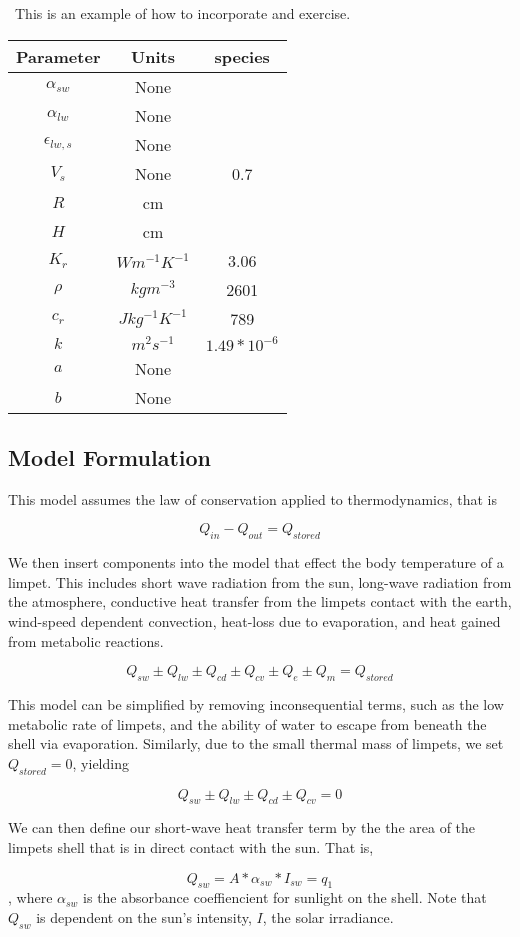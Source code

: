 \documentclass{article}
\begin{document}
\ This is an example of how to incorporate and exercise.

\begin{tabular}{| c | c | c |}\hline
Parameter & Units & species \\ \hline
$\alpha_{sw}$ & None & \\
$\alpha_{lw}$ & None & \\
$\epsilon_{lw,s}$ & None &\\
$V_s$ & None & 0.7\\
$R$ & cm &\\
$H$ & cm &\\
$K_r$ & $W m^{-1} K^{-1}$ & 3.06\\
$\rho$ & $kg m^{-3}$ & 2601\\
$c_r$ & $J kg^{-1} K^{-1}$ & 789\\
$k$ & $m^2 s^{-1}$ & $1.49*10^{-6}$\\ 
$a$ & None & \\
$b$ & None & \\ \hline
\end{tabular}

\subsection{Model Formulation}
This model assumes the law of conservation applied to thermodynamics, that is

$$Q_{in}-Q_{out}=Q_{stored}$$

We then insert components into the model that effect the body temperature of a limpet. This includes short wave radiation from the sun, long-wave radiation from the atmosphere, conductive heat transfer from the limpets contact with the earth, wind-speed dependent convection, heat-loss due to evaporation, and heat gained from metabolic reactions.

$$Q_{sw} \pm Q_{lw} \pm Q_{cd} \pm Q_{cv} \pm  Q_e \pm Q_m= Q_{stored}$$

This model can be simplified by removing inconsequential terms, such as the low metabolic rate of limpets, and the ability of water to escape from beneath the shell via evaporation. Similarly, due to the small thermal mass of limpets, we set $Q_{stored} = 0$, yielding 

$$Q_{sw} \pm Q_{lw} \pm Q_{cd} \pm Q_{cv} = 0$$

We can then define our short-wave heat transfer term by the the area of the limpets shell that is in direct contact with the sun. That is,

$$Q_{sw} = A*\alpha_{sw}*I_{sw} = q_1$$, where $\alpha_{sw}$ is the absorbance coeffiencient for sunlight on the shell. Note that $Q_{sw}$ is dependent on the sun's intensity, $I$, the solar irradiance.
\end{document}
